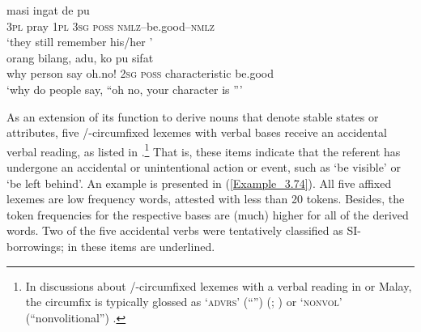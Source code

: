 \ea
\label{Example_3.72}
 {masi} {ingat} {de} {pu} {}\\ %
 \textsc{3pl}  pray  \textsc{1pl}  \textsc{3sg}  \textsc{poss}  \textsc{nmlz}–be.good–\textsc{nmlz}\\
\glt 
‘they still remember his/her ’ \textstyleExampleSource{[081110-008-CvNP.0261]}\\
\z
\ea
\label{Example_3.73}
 {orang} {bilang,} {adu}, {ko} {pu} {sifat} {}\\ %
 why  person  say  oh.no!  \textsc{2sg}  \textsc{poss}  characteristic  be.good\\
\glt 
‘why do people say, ``oh no, your character is ''' \textstyleExampleSource{[081110-008-CvNP.0134]}\\
\z


As an extension of its function to derive nouns that denote stable states or attributes, five \textitbf{-}/\textitbf{-}-circumfixed lexemes with verbal bases receive an accidental verbal reading, as listed in .\footnote{In discussions about \textitbf{-}/\textitbf{-}-circumfixed lexemes with a verbal reading in  or Malay, the circumfix is typically glossed as ‘\textsc{advrs}’ (``'') (\citealt{Englebretson.2003}; \citealt{Kroeger.2005}) or ‘\textsc{nonvol}’ (``nonvolitional'') \citep{Englebretson.2007}.} That is, these items indicate that the referent has undergone an accidental or unintentional action or event, such as  ‘be visible’ or  ‘be left behind’. An example is presented in (\ref{Example_3.74}). All five affixed lexemes are low frequency words, attested with less than 20 tokens. Besides, the token frequencies for the respective bases are (much) higher for all of the derived words. Two of the five accidental verbs were tentatively classified as SI-borrowings; in  these items are underlined.

